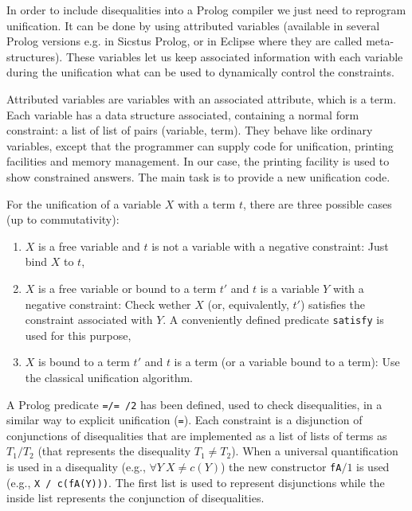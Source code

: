 \documentclass{llncs}
\begin{document}
In order to include disequalities into a Prolog compiler we just
need to reprogram unification. It can be done by using 
attributed variables \cite{Carlsson} (available in several
Prolog versions e.g. in Sicstus Prolog,
or in Eclipse where they are called meta-structures). These variables
let us keep associated information with each variable during the
unification what can be used to dynamically control the constraints.

Attributed variables are variables with an associated attribute, which
is a term. Each variable has a data structure associated, containing a
normal form constraint: a list of list of pairs (variable, term). They
behave like ordinary variables, except that the programmer can supply
code for unification, printing facilities and memory management. In
our case, the printing facility is used to show constrained
answers. The main task is to provide a new unification code.

For the unification of a variable $X$ with a term $t$, there are three
possible cases (up to commutativity):

\begin{enumerate}

   \item $X$ is a free variable and $t$ is not a variable with a
   negative constraint: Just bind $X$ to $t$,

   \item $X$ is a free variable or bound to a term $t'$ and $t$ is a
   variable $Y$ with a negative constraint: Check wether $X$ (or,
   equivalently, $t'$) satisfies the constraint associated with $Y$.
   A conveniently defined predicate {\tt satisfy} is used for this
   purpose,

   \item $X$ is bound to a term $t'$ and $t$ is a term (or a variable
   bound to a term): Use the classical unification algorithm.

\end{enumerate}

A Prolog predicate {\tt =/= /2} \cite{SusanaPADL2000} has been
defined, used to check disequalities, in a similar way to explicit
unification ({\tt =}). Each constraint is a disjunction of
conjunctions of disequalities that are implemented as a list of lists
of terms as $T_1/T_2$ (that represents the disequality $T_1 \neq
T_2$). When a universal quantification is used in a disequality (e.g.,
$\forall Y~ X \neq c(Y)$) the new constructor {\tt fA}$/1$ is used
(e.g., {\tt X / c(fA(Y)))}.  The first list is used to represent
disjunctions while the inside list represents the conjunction of
disequalities.
\end{document}
